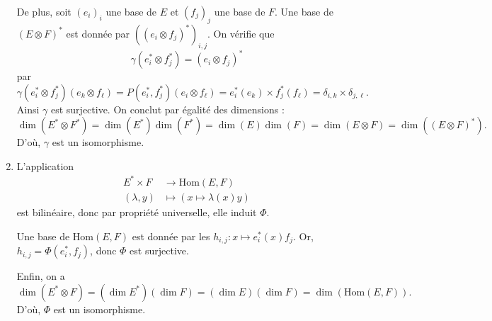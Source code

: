 \documentclass[./main]{subfiles}
\begin{document}
\begin{enumerate}
      De plus, soit $(e_i)_i$ une base de $E$ et $(f_j)_j$ une base de $F$.
      Une base de $(E \otimes F)^*$ est donnée par  $((e_i \otimes f_j)^*)_{i,j}$.
      On vérifie que \[
      \gamma(e_i^* \otimes f_j^*)  = (e_i \otimes f_j)^*
      \] par \[
      \gamma(e_i^* \otimes f_j^*) (e_k \otimes f_\ell) = P(e_i^*, f_j^*)(e_i \otimes f_\ell) = e_i^*(e_k) \times f_j^*(f_\ell) = \delta_{i,k} \times \delta_{j,\ell}
      .\]
      Ainsi $\gamma$ est surjective.
      On conclut par égalité des dimensions :
      {\tiny
       \[
      \dim(E^* \otimes F^*) = \dim(E^*)\dim(F^*) = \dim(E) \dim(F) = \dim(E \otimes F) = \dim((E \otimes F)^*)
      .\]}
      D'où, $\gamma$ est un isomorphisme.
    \item L'application 
      \begin{align*}
        E^* \times F &\longrightarrow \mathrm{Hom}(E, F) \\
        (\lambda, y) &\longmapsto (x \mapsto \lambda(x) y )
      \end{align*} est bilinéaire, donc par propriété universelle, elle induit $\Phi$.

      Une base de  $\mathrm{Hom}(E,F)$ est donnée par les $h_{i,j} : x \mapsto e_i^*(x) f_j$.
      Or, $h_{i,j} = \Phi(e_i^*, f_j)$, donc $\Phi$ est surjective.

      Enfin, on a {\small\[
      \dim(E^* \otimes F) = (\dim E^*)(\dim F) = (\dim E)(\dim F) = \dim(\mathrm{Hom}(E,F))
      .\]}
      D'où, $\Phi$ est un isomorphisme.
  \end{enumerate}
\end{document}
